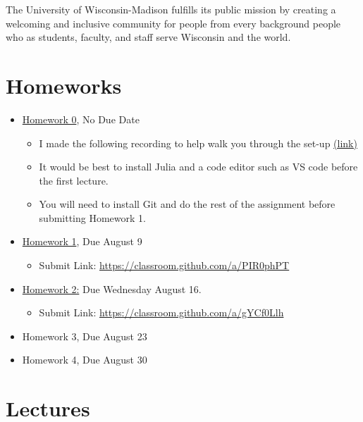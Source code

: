 \documentclass[
]{book}
\providecommand{\tightlist}{%
  \setlength{\itemsep}{0pt}\setlength{\parskip}{0pt}}
\begin{document}
The University of Wisconsin-Madison fulfills its public mission by creating a welcoming and inclusive community for people from every background people who as students, faculty, and staff serve Wisconsin and the world.

\hypertarget{homeworks}{%
\chapter{Homeworks}\label{homeworks}}

\begin{itemize}
\tightlist
\item
  \href{https://kevinghunt.github.io/ComputationCamp/homeworks/homework0.html}{Homework 0}, No Due Date

  \begin{itemize}
  \tightlist
  \item
    I made the following recording to help walk you through the set-up \href{https://uwmadison.zoom.us/rec/share/SbHWe_IMXFEaNy6ujwbKphJ2r3TgOvHtJqpkHT17NZDpX7cXcMdZhQtfmoC-WGNI.iN1B20YE_uH-QuFT?startTime=1690209565000}{(link)}
  \item
    It would be best to install Julia and a code editor such as VS code before the first lecture.
  \item
    You will need to install Git and do the rest of the assignment before submitting Homework 1.
  \end{itemize}
\item
  \href{https://kevinghunt.github.io/ComputationCamp/homeworks/homework1.html}{Homework 1}, Due August 9

  \begin{itemize}
  \tightlist
  \item
    Submit Link: \url{https://classroom.github.com/a/PIR0phPT}
  \end{itemize}
\item
  \href{https://kevinghunt.github.io/ComputationCamp/homeworks/homework2.html}{Homework 2:} Due Wednesday August 16.

  \begin{itemize}
  \tightlist
  \item
    Submit Link: \url{https://classroom.github.com/a/gYCf0Llh}
  \end{itemize}
\item
  Homework 3, Due August 23
\item
  Homework 4, Due August 30
\end{itemize}

\hypertarget{lectures}{%
\chapter{Lectures}\label{lectures}}
\end{document}
